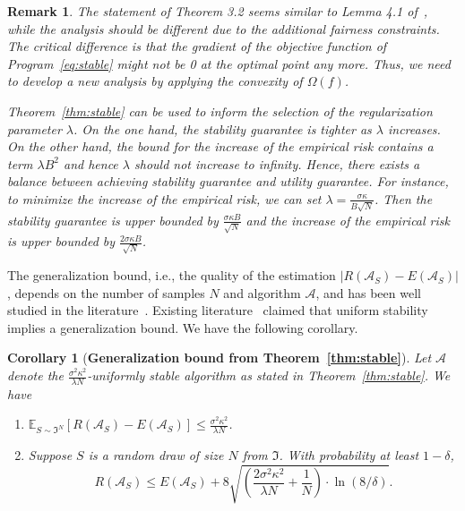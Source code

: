 \documentclass[11pt]{article}
\newcommand{\Exp}{\mathbb{E}}
\newtheorem{corollary}[theorem]{Corollary}
\newtheorem{remark}[theorem]{Remark}
\newcommand{\calA}{\mathcal{A}}
\newcommand{\calD}{\mathcal{D}}
\begin{document}
	\begin{remark}
		The statement of Theorem 3.2 seems similar to Lemma 4.1 of~\cite{bousquet2002stability}, while the analysis should be different due to the additional fairness constraints. 
		The critical difference is that the gradient of the objective function of Program~\ref{eq:stable} might not be 0 at the optimal point any more. 
		Thus, we need to develop a new analysis by applying the convexity of $\Omega(f)$. 
		
		Theorem~\ref{thm:stable} can be used to inform the selection of the regularization parameter $\lambda$. 
		On the one hand, the stability guarantee is tighter as $\lambda$ increases.
		On the other hand, the bound for the increase of the empirical risk contains a term $\lambda B^2$ and hence $\lambda$ should not increase to infinity.
		Hence, there exists a balance between achieving stability guarantee and utility guarantee.
		For instance, to minimize the increase of the empirical risk, we can set $\lambda = \frac{\sigma \kappa}{B \sqrt{N}}$. 
		Then the stability guarantee is upper bounded by $\frac{\sigma \kappa B}{\sqrt{N}}$ and the increase of the empirical risk is upper bounded by $\frac{2\sigma \kappa B}{\sqrt{N}}$.
	\end{remark}
	
	\noindent
	The generalization bound, i.e., the quality of the estimation $|R(\calA_S)-E(\calA_S)|$, depends on the number of samples $N$ and algorithm $\calA$, and has been well studied in the literature~\cite{adomavicius2011maximizing,bousquet2002stability,wainwright2006estimating,london2016stability}.
	Existing literature~\cite{bousquet2002stability,feldman2018generalization} claimed that uniform stability implies a generalization bound.
	We have the following corollary.
	
	\begin{corollary}[\bf Generalization bound from Theorem~\ref{thm:stable}]
		\label{cor:gen}
		Let $\calA$ denote the $\frac{\sigma^2 \kappa^2}{\lambda N}$-uniformly stable algorithm as stated in Theorem~\ref{thm:stable}.
		We have
		\begin{enumerate}
			\item $\Exp_{S\sim \Im^N}\left[R(\calA_S)-E(\calA_S)\right]\leq \frac{\sigma^2 \kappa^2}{\lambda N}$.
			\item Suppose $S$ is a random draw of size $N$ from $\Im$. 
			With probability at least $1-\delta$, 
			\[
			R(\calA_S)\leq E(\calA_S) + 8\sqrt{\left(\frac{2\sigma^2 \kappa^2}{\lambda N} +\frac{1}{N} \right) \cdot\ln (8/\delta)}.
			\]
		\end{enumerate}
	\end{corollary}
	
\end{document}
